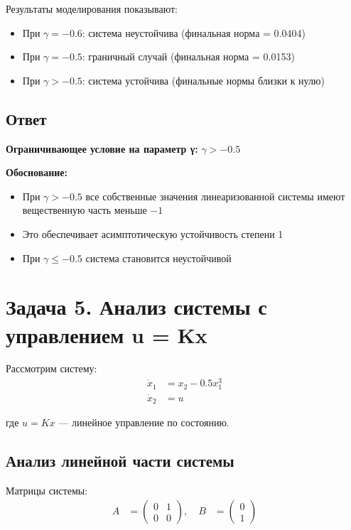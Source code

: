 Результаты моделирования показывают:
\begin{itemize}
\item При $\gamma = -0.6$: система неустойчива (финальная норма = 0.0404)
\item При $\gamma = -0.5$: граничный случай (финальная норма = 0.0153)
\item При $\gamma > -0.5$: система устойчива (финальные нормы близки к нулю)
\end{itemize}

\subsection{Ответ}

\textbf{Ограничивающее условие на параметр γ:} $\gamma > -0.5$

\textbf{Обоснование:}
\begin{itemize}
\item При $\gamma > -0.5$ все собственные значения линеаризованной системы имеют вещественную часть меньше $-1$
\item Это обеспечивает асимптотическую устойчивость степени 1
\item При $\gamma \leq -0.5$ система становится неустойчивой
\end{itemize}

\section{Задача 5. Анализ системы с управлением u = Kx}

Рассмотрим систему:
\begin{align}
\dot{x}_1 &= x_2 - 0.5x_1^3 \\
\dot{x}_2 &= u
\end{align}

где $u = Kx$ — линейное управление по состоянию.

\subsection{Анализ линейной части системы}

Матрицы системы:
\begin{align}
A &= \begin{pmatrix} 0 & 1 \\ 0 & 0 \end{pmatrix}, \quad
B &= \begin{pmatrix} 0 \\ 1 \end{pmatrix}
\end{align}

